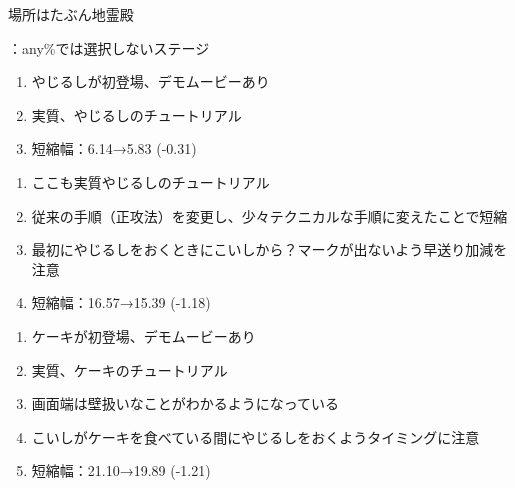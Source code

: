 

%





場所はたぶん地霊殿
\begin{marker}
{\TBW}：any\%では選択しないステージ
\end{marker}


\begin{enumerate}[label={\sarrow}]
\item やじるしが初登場、デモムービーあり
\item 実質、やじるしのチュートリアル
\item 短縮幅：6.14→5.83 (-0.31)
\end{enumerate}



\begin{enumerate}[label={\sarrow}]
\item ここも実質やじるしのチュートリアル
\item 従来の手順（正攻法）を変更し、少々テクニカルな手順に変えたことで短縮
\item 最初にやじるしをおくときにこいしから？\hspace{0pt}マークが出ないよう早送り加減を注意
\item 短縮幅：16.57→15.39 (-1.18)
\end{enumerate}



\begin{enumerate}[label={\sarrow}]
\item ケーキが初登場、デモムービーあり
\item 実質、ケーキのチュートリアル
\item 画面端は壁扱いなことがわかるようになっている
\item こいしがケーキを食べている間にやじるしをおくようタイミングに注意
\item 短縮幅：21.10→19.89 (-1.21)
\end{enumerate}



